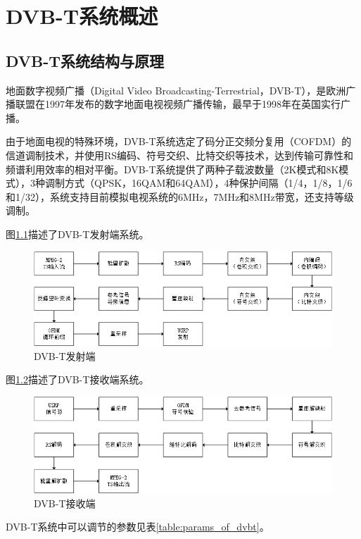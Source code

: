 \chapter{DVB-T系统概述}
	\section{DVB-T系统结构与原理}
	\label{sec:dvbt_summary}
		\par 地面数字视频广播（Digital Video Broadcasting-Terrestrial，DVB-T），是欧洲广播联盟在1997年发布的数字地面电视视频广播传输，最早于1998年在英国实行广播。
		\par 由于地面电视的特殊环境，DVB-T系统选定了码分正交频分复用（COFDM）的信道调制技术，并使用RS编码、符号交织、比特交织等技术，达到传输可靠性和频谱利用效率的相对平衡。DVB-T系统提供了两种子载波数量（2K模式和8K模式），3种调制方式（QPSK，16QAM和64QAM），4种保护间隔（1/4，1/8，1/6和1/32），系统支持目前模拟电视系统的6MHz，7MHz和8MHz带宽，还支持等级调制。
		\par 图\ref{fig:dvbt_tx}描述了DVB-T发射端系统。
		\begin{figure}[htp]
			\centering
			\includegraphics[width=13cm]{figures/dvbt_tx.png}
			\caption{DVB-T发射端}
			\label{fig:dvbt_tx}
		\end{figure}
		\par 图\ref{fig:dvbt_rx}描述了DVB-T接收端系统。
		\begin{figure}[htp]
			\centering
			\includegraphics[width=13cm]{figures/dvbt_rx.png}
			\caption{DVB-T接收端}
			\label{fig:dvbt_rx}
		\end{figure}
		\par DVB-T系统中可以调节的参数见表\ref{table:params_of_dvbt}。
